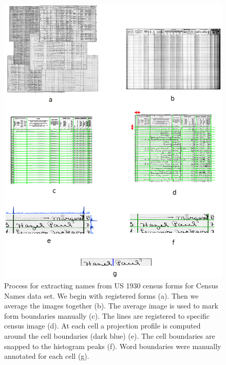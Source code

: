 \documentclass[ms,electronic,twosidetoc,letterpaper,chaptercenter,parttop,lof,lot]{byumsphd}
\begin{document}
\begin{figure}
    \centering
    \includegraphics[width=.9\textwidth]{makenames}
    \caption{Process for extracting names from US 1930 census forms for Census Names data set. We begin with registered forms (a). Then we average the images together (b). The average image is used to mark form boundaries manually (c). The lines are registered to specific census image (d). At each cell a projection profile is computed around the cell boundaries (dark blue) (e). The cell boundaries are snapped to the histogram peaks (f). Word boundaries were manually annotated for each cell (g).}
    \label{fig:makenames}
\end{figure}
\end{document}
